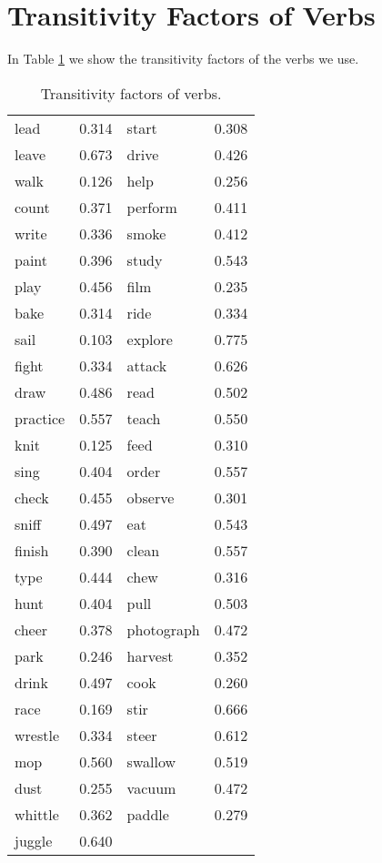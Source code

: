 \section{Transitivity Factors of Verbs}
\label{sec:verb_factors}

In Table \ref{tab:verbTransitivity} we show the transitivity factors of the verbs we use.

\begin{table}[h!]
\centering
\begin{tabular}{llll}

\midrule
lead & 0.314 & start & 0.308 \\ 
leave & 0.673 & drive & 0.426 \\ 
walk & 0.126 & help & 0.256 \\ 
count & 0.371 & perform & 0.411 \\ 
write & 0.336 & smoke & 0.412 \\ 
paint & 0.396 & study & 0.543 \\ 
play & 0.456 & film & 0.235 \\ 
bake & 0.314 & ride & 0.334 \\ 
sail & 0.103 & explore & 0.775 \\ 
fight & 0.334 & attack & 0.626 \\ 
draw & 0.486 & read & 0.502 \\ 
practice & 0.557 & teach & 0.550 \\ 
knit & 0.125 & feed & 0.310 \\ 
sing & 0.404 & order & 0.557 \\ 
check & 0.455 & observe & 0.301 \\ 
sniff & 0.497 & eat & 0.543 \\ 
finish & 0.390 & clean & 0.557 \\ 
type & 0.444 & chew & 0.316 \\ 
hunt & 0.404 & pull & 0.503 \\ 
cheer & 0.378 & photograph & 0.472 \\ 
park & 0.246 & harvest & 0.352 \\ 
drink & 0.497 & cook & 0.260 \\ 
race & 0.169 & stir & 0.666 \\ 
wrestle & 0.334 & steer & 0.612 \\ 
mop & 0.560 & swallow & 0.519 \\ 
dust & 0.255 & vacuum & 0.472 \\ 
whittle & 0.362 & paddle & 0.279 \\ 
juggle & 0.640 \\ 
\bottomrule
\end{tabular}
\caption{Transitivity factors of verbs.}
\label{tab:verbTransitivity}
\end{table}